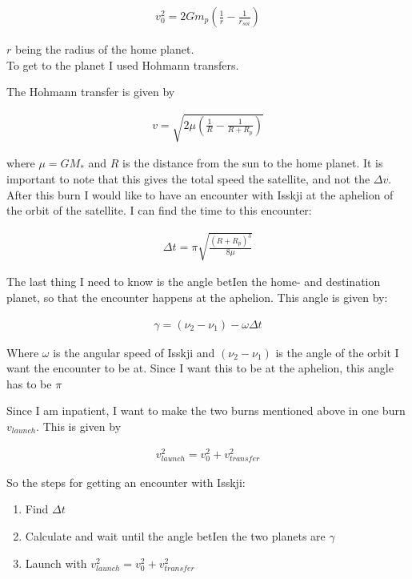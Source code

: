 \documentclass[a4paper, 10pt]{article}
\begin{document}
\begin{align}
v_{0}^2 = 2Gm_p \left( \frac{1}{r} - \frac{1}{r_{soi}} \right) 
\end{align}

$r$ being the radius of the home planet. \\

To get to the planet I used Hohmann transfers\cite{SpaceDynamics}.

The Hohmann transfer is given by

\begin{align}
v = \sqrt{2\mu \left( \frac{1}{R} - \frac{1}{R + R_p} \right)}
\end{align}

where $\mu = GM_*$ and $R$ is the distance from the sun to the home planet. It is important to note that this gives the total speed the satellite, and not the $\Delta v$. \\

After this burn I would like to have an encounter with Isskji at the aphelion of the orbit of the satellite. I can find the time to this encounter:

\begin{align}
\Delta t = \pi \sqrt{\frac{(R +R_p)^3}{8\mu}}
\end{align}

The last thing I need to know is the angle betIen the home- and destination planet, so that the encounter happens at the aphelion. This angle is given by:

\begin{align}
\gamma = (\nu_2 -\nu_1) - \omega \Delta t
\end{align}

Where $\omega$ is the angular speed of Isskji and $(\nu_2 -\nu_1)$ is the angle of the orbit I want the encounter to be at. Since I want this to be at the aphelion, this angle has to be $\pi$

Since I am inpatient, I want to make the two burns mentioned above in one burn $v_{launch}$. This is given by

\begin{align}
v_{launch}^2 = v_0^2 + v_{transfer}^2
\end{align} 

So the steps for getting an encounter with Isskji:

\begin{enumerate}
\item Find $\Delta t$
\item Calculate and wait until the angle betIen the two planets are $\gamma$
\item Launch with $v_{launch}^2 = v_0^2 + v_{transfer}^2$ 
\end{enumerate}
\end{document}
